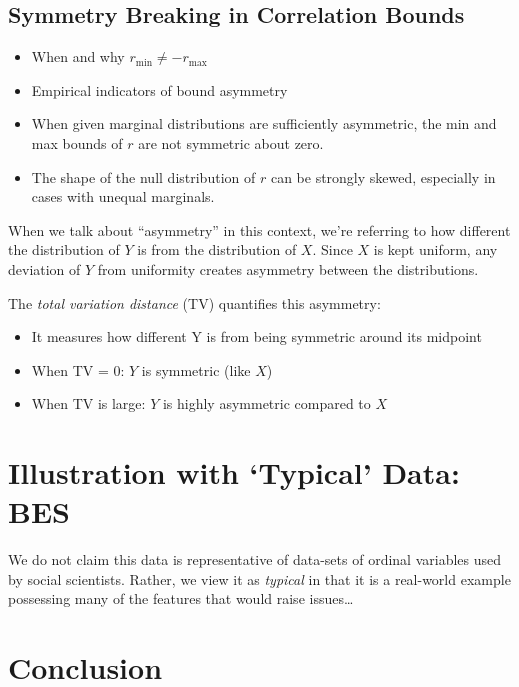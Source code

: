 \documentclass[
  12pt,
]{article}
\providecommand{\tightlist}{%
  \setlength{\itemsep}{0pt}\setlength{\parskip}{0pt}}\usepackage{longtable,booktabs,array}
\theoremstyle{plain}
\theoremstyle{definition}
\theoremstyle{remark}
\begin{document}
\subsection{Symmetry Breaking in Correlation
Bounds}\label{symmetry-breaking-in-correlation-bounds}

\begin{itemize}
\item
  When and why \(r_{\min} \neq -r_{\max}\)
\item
  Empirical indicators of bound asymmetry
\item
  When given marginal distributions are sufficiently asymmetric, the min
  and max bounds of \(r\) are not symmetric about zero.
\item
  The shape of the null distribution of \(r\) can be strongly skewed,
  especially in cases with unequal marginals.
\end{itemize}

When we talk about ``asymmetry'' in this context, we're referring to how
different the distribution of \(Y\) is from the distribution of \(X\).
Since \(X\) is kept uniform, any deviation of \(Y\) from uniformity
creates asymmetry between the distributions.

The \emph{total variation distance} (TV) quantifies this asymmetry:

\begin{itemize}
\tightlist
\item
  It measures how different Y is from being symmetric around its
  midpoint
\item
  When TV = 0: \(Y\) is symmetric (like \(X\))
\item
  When TV is large: \(Y\) is highly asymmetric compared to \(X\)
\end{itemize}

\section{Illustration with `Typical' Data:
BES}\label{illustration-with-typical-data-bes}

We do not claim this data is representative of data-sets of ordinal
variables used by social scientists. Rather, we view it as
\emph{typical} in that it is a real-world example possessing many of the
features that would raise issues\ldots{}

\section{Conclusion}\label{conclusion}
\end{document}
